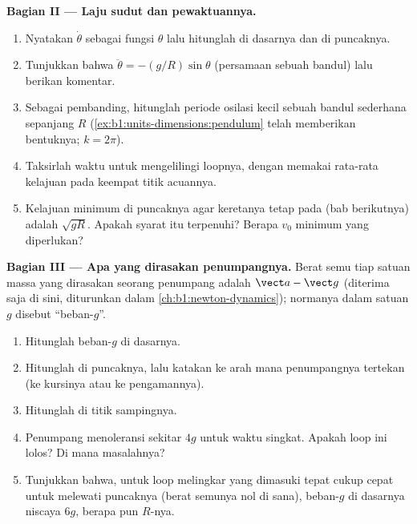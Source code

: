 \begin{problem}
\medskip
\noindent\textbf{Bagian II --- Laju sudut dan pewaktuannya.}
\begin{enumerate}[resume]
  \item Nyatakan $\dot\theta$ sebagai fungsi $\theta$ lalu hitunglah di
        dasarnya dan di puncaknya.
  \item Tunjukkan bahwa $\ddot\theta = -(g/R)\sin\theta$ (persamaan
        sebuah bandul) lalu berikan komentar.
  \item Sebagai pembanding, hitunglah periode osilasi kecil sebuah
        bandul sederhana sepanjang $R$
        (\cref{ex:b1:units-dimensions:pendulum} telah memberikan
        bentuknya; $k = 2\pi$).
  \item Taksirlah waktu untuk mengelilingi loopnya, dengan memakai
        rata-rata kelajuan pada keempat titik acuannya.
  \item Kelajuan minimum di puncaknya agar keretanya tetap pada
         (bab berikutnya) adalah $\sqrt{gR}$. Apakah syarat
        itu terpenuhi? Berapa $v_0$ minimum yang diperlukan?
\end{enumerate}

\medskip
\noindent\textbf{Bagian III --- Apa yang dirasakan penumpangnya.}
Berat semu tiap satuan massa yang dirasakan seorang penumpang adalah
$\vect a - \vect g$ (diterima saja di sini, diturunkan dalam
\cref{ch:b1:newton-dynamics}); normanya dalam satuan $g$ disebut ``beban-$g$''.
\begin{enumerate}[resume]
  \item Hitunglah beban-$g$ di dasarnya.
  \item Hitunglah di puncaknya, lalu katakan ke arah mana penumpangnya
        tertekan (ke kursinya atau ke pengamannya).
  \item Hitunglah di titik sampingnya.
  \item Penumpang menoleransi sekitar $4g$ untuk waktu singkat. Apakah
        loop ini lolos? Di mana masalahnya?
  \item Tunjukkan bahwa, untuk loop melingkar yang dimasuki tepat cukup
        cepat untuk melewati puncaknya (berat semunya nol di sana),
        beban-$g$ di dasarnya niscaya $6g$, berapa pun $R$-nya.
\end{enumerate}


\end{problem}
